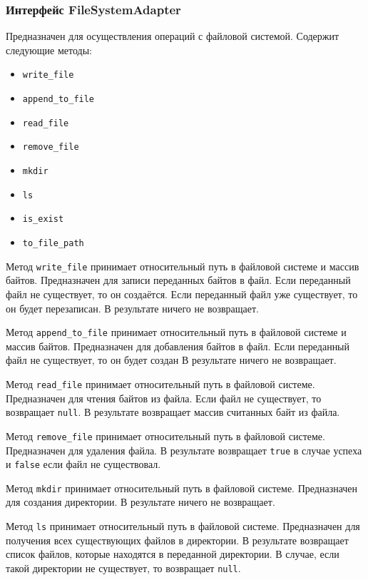 \subsubsection{Интерфейс FileSystemAdapter}
Предназначен для осуществления операций с файловой системой.
Содержит следующие методы:
\begin{itemize}
    \item \texttt{write\_file}
    \item \texttt{append\_to\_file}
    \item \texttt{read\_file}
    \item \texttt{remove\_file}
    \item \texttt{mkdir}
    \item \texttt{ls}
    \item \texttt{is\_exist}
    \item \texttt{to\_file\_path}
\end{itemize}

Метод \texttt{write\_file} принимает относительный путь в файловой системе и массив байтов.
Предназначен для записи переданных байтов в файл.
Если переданный файл не существует, то он создаётся.
Если переданный файл уже существует, то он будет перезаписан.
В результате ничего не возвращает.

Метод \texttt{append\_to\_file} принимает относительный путь в файловой системе и массив байтов.
Предназначен для добавления байтов в файл.
Если переданный файл не существует, то он будет создан
В результате ничего не возвращает.

Метод \texttt{read\_file} принимает относительный путь в файловой системе.
Предназначен для чтения байтов из файла.
Если файл не существует, то возвращает \texttt{null}.
В результате возвращает массив считанных байт из файла.

Метод \texttt{remove\_file} принимает относительный путь в файловой системе.
Предназначен для удаления файла.
В результате возвращает \texttt{true} в случае успеха и \texttt{false} если файл не существовал.

Метод \texttt{mkdir} принимает относительный путь в файловой системе.
Предназначен для создания директории. 
В результате ничего не возвращает.

Метод \texttt{ls} принимает относительный путь в файловой системе.
Предназначен для получения всех существующих файлов в директории.
В результате возвращает список файлов, которые находятся в переданной директории.
В случае, если такой директории не существует, то возвращает \texttt{null}.

